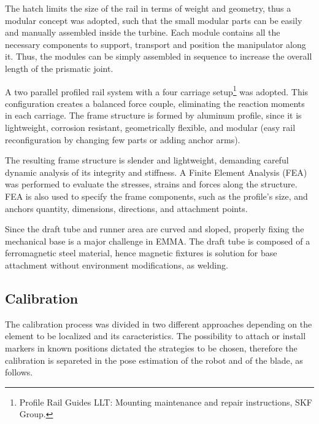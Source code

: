 The hatch limits the size of the rail in terms of weight
and geometry, thus a modular concept was adopted, such that the small modular
parts can be easily and manually assembled inside the turbine. Each module
contains all the necessary components to support, transport and position the
manipulator along it. Thus, the modules can be simply assembled in
sequence to increase the overall length of the prismatic joint.

A two parallel profiled rail system with a four carriage
setup\footnote{Profile Rail Guides LLT: Mounting maintenance and repair
instructions, SKF Group.} was adopted. %
This configuration creates a balanced force couple, eliminating the reaction
moments in each carriage. The frame structure is formed by aluminum
profile, since it is lightweight, corrosion resistant, geometrically flexible,
and modular (easy rail reconfiguration by changing few parts or adding anchor
arms).

The resulting frame structure is slender and lightweight, demanding careful
dynamic analysis of its integrity and stiffness. A Finite Element Analysis (FEA)
was performed to evaluate the stresses, strains and forces along the structure.
FEA is also used to specify the frame components, such as the profile's size,
and anchors quantity, dimensions, directions, and attachment points.

Since the draft tube and runner area are curved and sloped, properly fixing
the mechanical base is a major challenge in EMMA. The draft tube is composed of a
ferromagnetic steel material, hence magnetic fixtures is solution for
base attachment without environment modifications, as welding.

\subsection{Calibration}
 
The calibration process was divided in two different approaches depending on the
element to be localized and its caracteristics. The possibility to attach or
install markers in known positions dictated the strategies to be chosen,
therefore the calibration is separeted in the pose estimation of the robot and
of the blade, as follows.
   
